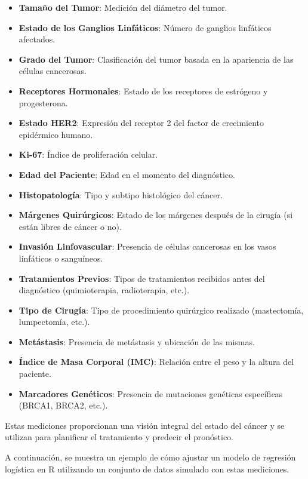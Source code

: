 \begin{itemize}
    \item \textbf{Tamaño del Tumor}: Medición del diámetro del tumor.
    \item \textbf{Estado de los Ganglios Linfáticos}: Número de ganglios linfáticos afectados.
    \item \textbf{Grado del Tumor}: Clasificación del tumor basada en la apariencia de las células cancerosas.
    \item \textbf{Receptores Hormonales}: Estado de los receptores de estrógeno y progesterona.
    \item \textbf{Estado HER2}: Expresión del receptor 2 del factor de crecimiento epidérmico humano.
    \item \textbf{Ki-67}: Índice de proliferación celular.
    \item \textbf{Edad del Paciente}: Edad en el momento del diagnóstico.
    \item \textbf{Histopatología}: Tipo y subtipo histológico del cáncer.
    \item \textbf{Márgenes Quirúrgicos}: Estado de los márgenes después de la cirugía (si están libres de cáncer o no).
    \item \textbf{Invasión Linfovascular}: Presencia de células cancerosas en los vasos linfáticos o sanguíneos.
    \item \textbf{Tratamientos Previos}: Tipos de tratamientos recibidos antes del diagnóstico (quimioterapia, radioterapia, etc.).
    \item \textbf{Tipo de Cirugía}: Tipo de procedimiento quirúrgico realizado (mastectomía, lumpectomía, etc.).
    \item \textbf{Metástasis}: Presencia de metástasis y ubicación de las mismas.
    \item \textbf{Índice de Masa Corporal (IMC)}: Relación entre el peso y la altura del paciente.
    \item \textbf{Marcadores Genéticos}: Presencia de mutaciones genéticas específicas (BRCA1, BRCA2, etc.).
\end{itemize}

Estas mediciones proporcionan una visión integral del estado del cáncer y se utilizan para planificar el tratamiento y predecir el pronóstico.

A continuación, se muestra un ejemplo de cómo ajustar un modelo de regresión logística en R utilizando un conjunto de datos simulado con estas mediciones.

